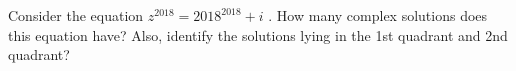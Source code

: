 Consider the equation  $z^{2018}=2018^{2018}+i$ . How many complex solutions does this equation have? Also, identify the solutions lying in the 1st quadrant and 2nd quadrant?
